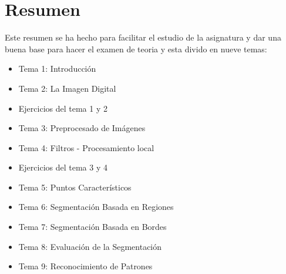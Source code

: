 

\chapter*{Resumen}



\todo[inline]{}
	
Este resumen se ha hecho para facilitar el estudio de la asignatura y dar una buena base para hacer el examen de teoria y esta divido en nueve temas:

\begin{itemize}
    \item Tema 1: Introducción
    \item Tema 2: La Imagen Digital
    \item Ejercicios del tema 1 y 2
    \item Tema 3: Preprocesado de Imágenes
    \item Tema 4: Filtros - Procesamiento local
    \item Ejercicios del tema 3 y 4
    \item Tema 5: Puntos Característicos
    \item Tema 6: Segmentación Basada en Regiones
    \item Tema 7: Segmentación Basada en Bordes
    \item Tema 8: Evaluación de la Segmentación
    \item Tema 9: Reconocimiento  de Patrones
\end{itemize}    




